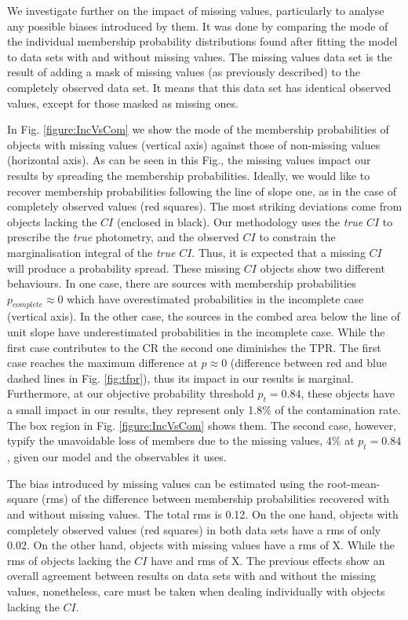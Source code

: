 We investigate further on the impact of missing values, particularly to analyse any possible biases introduced by them. It was done by comparing the mode of the individual membership probability distributions found after fitting the model to data sets with and without missing values. The missing values data set is the result of adding a mask of missing values (as previously described) to the completely observed data set. It means that this data set has identical observed values, except for those masked as missing ones. 

In Fig. \ref{figure:IncVsCom} we show the mode of the membership probabilities of objects with missing values (vertical axis) against those of non-missing values (horizontal axis). As can be seen in this Fig., the missing values impact our results by spreading the membership probabilities. Ideally, we would like to recover membership probabilities following the line of slope one, as in the case of completely observed values (red squares). The most striking deviations come from objects lacking the $CI$ (enclosed in black). Our methodology uses the \emph{true} $CI$ to prescribe the \emph{true} photometry, and the observed $CI$ to constrain the marginalisation integral of the \emph{true} $CI$. Thus, it is expected that a missing $CI$ will produce a probability spread. These missing $CI$ objects show two different behaviours. In one case, there are sources with membership probabilities $p_{complete} \approx0$ which have overestimated probabilities in the incomplete case (vertical axis). In the other case, the sources in the combed area below the line of unit slope have underestimated probabilities in the incomplete case. While the first case contributes to the CR the second one diminishes the TPR. The first case reaches the maximum difference at $p \approx 0$ (difference between red and blue dashed lines in Fig. \ref{fig:tfpr}), thus its impact in our results is marginal. Furthermore, at our objective probability threshold $p_t=0.84$, these objects have a small impact in our results, they represent only 1.8\% of the contamination rate. The box region in Fig. \ref{figure:IncVsCom} shows them. The second case, however, typify the unavoidable loss of members due to the missing values, 4\% at $p_t=0.84$, given our model and the observables it uses.


The bias introduced by missing values can be estimated using the root-mean-square (rms) of the difference between membership probabilities recovered with and without missing values. The total rms is 0.12. On the one hand, objects with completely observed values (red squares) in both data sets have a rms of only 0.02. On the other hand, objects with missing values have a rms of X. While the rms of objects lacking the $CI$ have and rms of X.  The previous effects show an overall agreement between results on data sets with and without the missing values, nonetheless, care must be taken when dealing individually with objects lacking the $CI$. 


